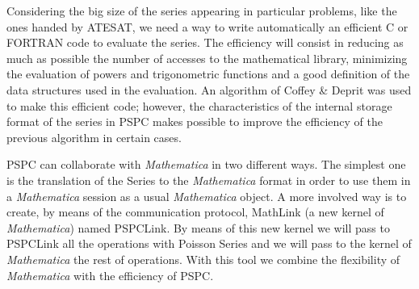 Considering the big size of the series  appearing in particular problems, like
the ones handed by ATESAT, we need  a way to write automatically an efficient C or FORTRAN
code to evaluate the series.  The efficiency will consist in reducing as much as
possible the number of accesses to the mathematical library, minimizing the evaluation of powers
and trigonometric functions and a good definition of the data structures used in the
evaluation. An algorithm of Coffey \& Deprit \cite{coffey} was used to make this efficient code;
however, the characteristics of the internal storage format of the series in PSPC makes
possible to improve the efficiency of the previous algorithm in certain cases.
\par\medskip

PSPC can collaborate with {\sl Mathematica} in two different
ways. The  simplest one    is the translation of the Series to the {\sl
Mathematica} format in order to use them in a {\sl Mathematica} session as a
usual {\sl Mathematica} object. A more involved way is to create, by means of the
communication protocol, MathLink (a new kernel of {\sl Mathematica}) named
PSPCLink. By means of this new kernel we will pass to PSPCLink all the operations
with Poisson Series and  we will pass to the kernel of {\sl Mathematica}
the rest of operations.  With this tool we combine the flexibility of {\sl
Mathematica} with the efficiency of PSPC.

